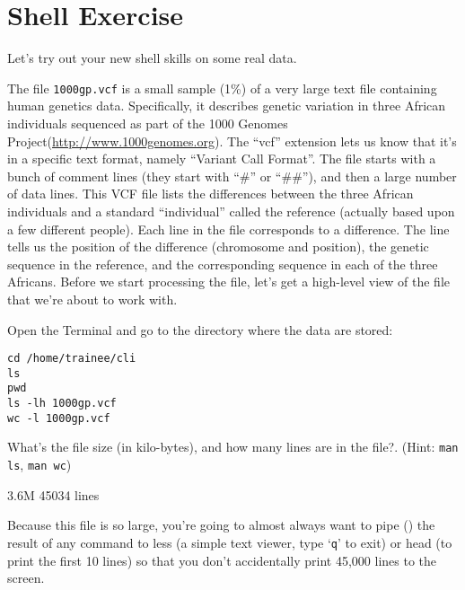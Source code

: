 \newpage
\section{Shell Exercise}

\begin{information}
Let's try out your new shell skills on some real data.

The file \texttt{1000gp.vcf} is a small sample (1\%) of a very large text file containing human genetics data. Specifically, it describes genetic variation in three African individuals sequenced as part of the 1000 Genomes Project(\url{http://www.1000genomes.org}).
The ``vcf'' extension lets us know that it's in a specific text format, namely ``Variant Call Format''. The file starts with a bunch of comment lines (they start with ``#'' or ``##''), and then a large number of data lines. This VCF file lists the differences between the three African individuals and a standard ``individual'' called the reference (actually based upon a few different people). Each line in the file corresponds to a difference. The line tells us the position of the difference (chromosome and position), the genetic sequence in the reference, and the corresponding sequence in each of the three Africans.
Before we start processing the file, let's get a high-level view of the file that we're about to work with.

\end{information}

\begin{steps}
Open the Terminal and go to the directory where the data are stored:
\begin{lstlisting}
cd /home/trainee/cli
ls
pwd
ls -lh 1000gp.vcf
wc -l 1000gp.vcf
\end{lstlisting}
\end{steps}

\begin{questions}
What's the file size (in kilo-bytes), and how many lines are in the file?. (Hint: \texttt{man ls}, \texttt{man wc})
\begin{answer}
3.6M
45034 lines
\end{answer}
\end{questions}


\begin{note}
Because this file is so large, you're going to almost always want to pipe (\textpipe) the result of any command to less (a simple text viewer, type  `\texttt{q}' to exit) or head (to print the first 10 lines) so that you don't accidentally print 45,000 lines to the screen.
\end{note}

